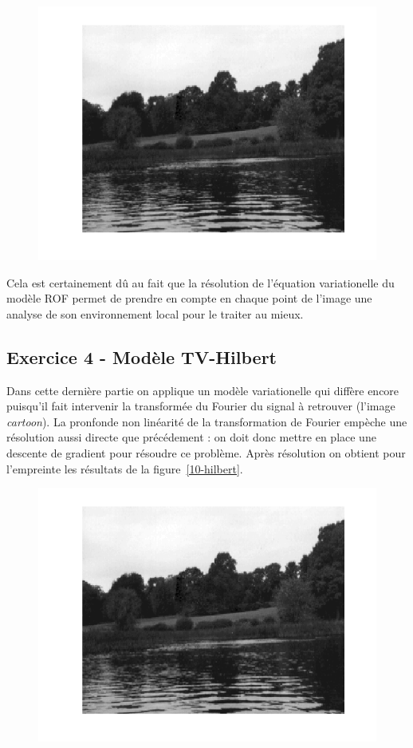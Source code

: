 \documentclass{article}
\begin{document}
\begin{figure}[!ht]
\includegraphics[width=\textwidth]{images/1/1-1-autumn_b.png}
\end{figure}

Cela est certainement dû au fait que la résolution de l'équation variationelle du modèle ROF permet de prendre en compte en chaque point de l'image une analyse de son environnement local pour le traiter au mieux.

\subsection{Exercice 4 - Modèle TV-Hilbert}
Dans cette dernière partie on applique un modèle variationelle qui diffère encore puisqu'il fait intervenir la transformée du Fourier du signal à retrouver (l'image \emph{cartoon}). La pronfonde non linéarité de la transformation de Fourier empèche une résolution aussi directe que précédement : on doit donc mettre en place une descente de gradient pour résoudre ce problème. Après résolution on obtient pour l'empreinte les résultats de la figure~\ref{10-hilbert}.

\begin{figure}[!ht]
\includegraphics[width=\textwidth]{images/1/1-1-autumn_b.png}
\end{figure}
\end{document}
